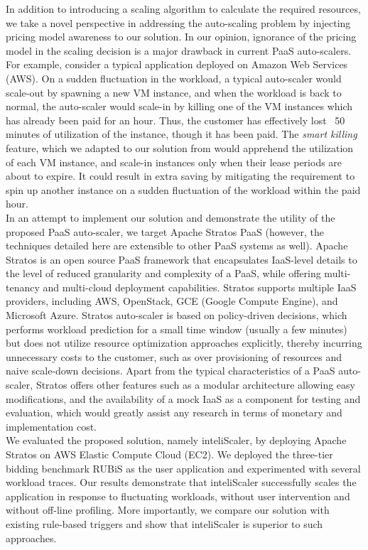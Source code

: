 In addition to introducing a scaling algorithm to calculate the required resources, we take a novel perspective in addressing the auto-scaling problem by injecting pricing model awareness to our solution. In our opinion, ignorance of the pricing model in the scaling decision is a major drawback in current PaaS auto-scalers. For example, consider a typical application deployed on Amazon Web Services (AWS). On a sudden fluctuation in the workload, a typical auto-scaler would scale-out by spawning a new VM instance, and when the workload is back to normal, the auto-scaler would scale-in by killing one of the VM instances which has already been paid for an hour. Thus, the customer has effectively lost ~50 minutes of utilization of the instance, though it has been paid. The \textit{smart killing} feature, which we adapted to our solution from \cite{pluggable} would apprehend the utilization of each VM instance, and scale-in instances only when their lease periods are about to expire. It could result in extra saving by mitigating the requirement to spin up another instance on a sudden fluctuation of the workload within the paid hour.\\

In an attempt to implement our solution and demonstrate the utility of the proposed PaaS auto-scaler, we target Apache Stratos PaaS (however, the techniques detailed here are extensible to other PaaS systems as well). Apache Stratos is an open source PaaS framework that encapsulates IaaS-level details to the level of reduced granularity and complexity of a PaaS, while offering multi-tenancy and multi-cloud deployment capabilities. Stratos supports multiple IaaS providers, including AWS, OpenStack, GCE (Google Compute Engine), and Microsoft Azure\cite{website:stratos}. Stratos auto-scaler is based on policy-driven decisions, which performs workload prediction for a small time window (usually a few minutes) but does not utilize resource optimization approaches explicitly, thereby incurring unnecessary costs to the customer, such as over provisioning of resources and naive scale-down decisions. Apart from the typical characteristics of a PaaS auto-scaler, Stratos offers other features such as a modular architecture allowing easy modifications, and the availability of a mock IaaS as a component for testing and evaluation, which would greatly assist any research in terms of monetary and implementation cost.\\

We evaluated the proposed solution, namely inteliScaler, by deploying Apache Stratos on AWS Elastic Compute Cloud (EC2). We deployed the three-tier bidding benchmark RUBiS as the user application and experimented with several workload traces. Our results demonstrate that inteliScaler successfully scales the application in response to fluctuating workloads, without user intervention and without off-line profiling. More importantly, we compare our solution with existing rule-based triggers and show that inteliScaler is superior to such approaches.\\

